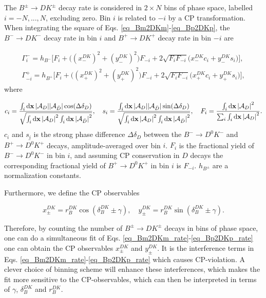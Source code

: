 \documentclass[12pt, a4paper, notitlepage, onecolumn]{article}
\numberwithin{equation}{section}
\begin{document}
The $B^\pm\to DK^\pm$ decay rate is considered in $2\times N$ bins of phase space, labelled $i = -N, ..., N$, excluding zero. Bin $i$ is related to $-i$ by a CP transformation. When integrating the square of Eqs. \eqref{eq_Bm2DKm}-\eqref{eq_Bp2DKp}, the $B^-\to DK^-$ decay rate in bin $i$ and $B^+\to DK^+$ decay rate in bin $-i$ are

\begin{align}
  \Gamma^-_i = h_{B^-}\Big[F_i + \big((x_-^{DK})^2 + (y_-^{DK})^2\big)F_{-i} + 2\sqrt{F_iF_{-i}}\big(x_-^{DK}c_i + y_-^{DK}s_i\big)\Big], \label{eq_Bm2DKm_rate} \\
  \Gamma^+_{-i} = h_{B^+}\Big[F_i + \big((x_+^{DK})^2 + (y_+^{DK})^2\big)F_{-i} + 2\sqrt{F_iF_{-i}}\big(x_+^{DK}c_i + y_+^{DK}s_i\big)\Big], \label{eq_Bp2DKp_rate}
\end{align}
where

\begin{equation}
  c_i = \frac{\int_i\dd{\vb{x}}\abs{\mathcal{A}_D}\abs{\mathcal{A}_{\bar{D}}}\cos(\Delta\delta_D)}{\sqrt{\int_i\dd{\vb{x}}\abs{\mathcal{A}_D}^2\int_i\dd{\vb{x}}\abs{\mathcal{A}_{\bar{D}}}^2}}, \quad s_i = \frac{\int_i\dd{\vb{x}}\abs{\mathcal{A}_D}\abs{\mathcal{A}_{\bar{D}}}\sin(\Delta\delta_D)}{\sqrt{\int_i\dd{\vb{x}}\abs{\mathcal{A}_D}^2\int_i\dd{\vb{x}}\abs{\mathcal{A}_{\bar{D}}}^2}}, \quad F_i = \frac{\int_i\dd{\vb{x}}\abs{\mathcal{A}_D}^2}{\sum_i\int_i\dd{\vb{x}}\abs{\mathcal{A}_D}^2}.
  \label{eq_hadronic_parameters}
\end{equation}
$c_i$ and $s_i$ is the strong phase difference $\Delta\delta_D$ between the $B^-\to D^0K^-$ and $B^+\to\bar{D^0}K^+$ decays, amplitude-averaged over bin $i$. $F_i$ is the fractional yield of $B^-\to D^0K^-$ in bin $i$, and assuming CP conservation in $D$ decays the corresponding fractional yield of $B^+\to D^0K^+$ in bin $i$ is $F_{-i}$. $h_{B^\pm}$ are a normalization constants.

Furthermore, we define the CP observables

\begin{equation}
  x_\pm^{DK} = r_B^{DK}\cos(\delta_B^{DK}\pm\gamma), \quad  y_\pm^{DK} = r_B^{DK}\sin(\delta_B^{DK}\pm\gamma).
  \label{eq_xy_cp}
\end{equation}

Therefore, by counting the number of $B^\pm\to DK^\pm$ decays in bins of phase space, one can do a simultaneous fit of Eqs. \eqref{eq_Bm2DKm_rate}-\eqref{eq_Bp2DKp_rate} one can obtain the CP observables $x_\pm^{DK}$ and $y_\pm^{DK}$. It is the interference terms in Eqs. \eqref{eq_Bm2DKm_rate}-\eqref{eq_Bp2DKp_rate} which causes CP-violation. A clever choice of binning scheme will enhance these interferences, which makes the fit more sensitive to the CP-observables, which can then be interpreted in terms of $\gamma$, $\delta_B^{DK}$ and $r_B^{DK}$.
\end{document}
